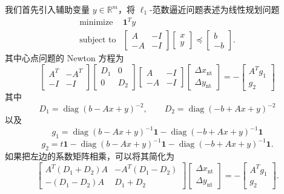 \documentclass[UTF8,12pt,a4paper,fontset=fandol]{ctexart}
\begin{document}
我们首先引入辅助变量 $y\in\mathbb{R}^m$，将 $\ell_1$-范数逼近问题表述为线性规划问题
\[
\begin{array}{ll}
\text{minimize} & \mathbf{1}^Ty\\
\text{subject to} &
\begin{bmatrix}
A & -I\\
-A & -I
\end{bmatrix}
\begin{bmatrix}
x\\
y
\end{bmatrix}
\preceq
\begin{bmatrix}
b\\
-b
\end{bmatrix}.
\end{array}
\]
其中心点问题的 Newton 方程为
\[
\begin{bmatrix}
A^T & -A^T\\
-I & -I
\end{bmatrix}
\begin{bmatrix}
D_1 & 0\\
0 & D_2
\end{bmatrix}
\begin{bmatrix}
A & -I\\
-A & -I
\end{bmatrix}
\begin{bmatrix}
\Delta x_{\mathrm{nt}}\\
\Delta y_{\mathrm{nt}}
\end{bmatrix}
=-
\begin{bmatrix}
A^Tg_1\\
g_2
\end{bmatrix}
\]
其中
\[
D_1=\operatorname{diag}(b-Ax+y)^{-2},\qquad
D_2=\operatorname{diag}(-b+Ax+y)^{-2}
\]
以及
\[
g_1=\operatorname{diag}(b-Ax+y)^{-1}\mathbf{1}
-\operatorname{diag}(-b+Ax+y)^{-1}\mathbf{1}
\]
\[
g_2=t\mathbf{1}-\operatorname{diag}(b-Ax+y)^{-1}\mathbf{1}
-\operatorname{diag}(-b+Ax+y)^{-1}\mathbf{1}.
\]
如果把左边的系数矩阵相乘，可以将其简化为
\[
\begin{bmatrix}
A^T(D_1+D_2)A & -A^T(D_1-D_2)\\
-(D_1-D_2)A & D_1+D_2
\end{bmatrix}
\begin{bmatrix}
\Delta x_{\mathrm{nt}}\\
\Delta y_{\mathrm{nt}}
\end{bmatrix}
=-
\begin{bmatrix}
A^Tg_1\\
g_2
\end{bmatrix}.
\]
\end{document}
